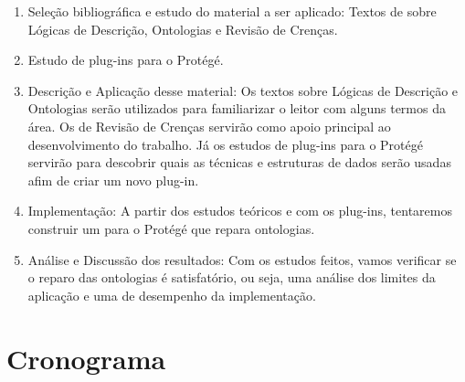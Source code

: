 \documentclass[12pt,letterpaper]{article}
\begin{document}
	\begin{enumerate}
		\item Seleção bibliográfica e estudo do material a ser aplicado: Textos de sobre Lógicas de Descrição, Ontologias e Revisão de Crenças. 
		\item Estudo de plug-ins para o Protégé.
		\item Descrição e Aplicação desse material: Os textos sobre Lógicas de Descrição e Ontologias serão utilizados para familiarizar o leitor com alguns termos da área. Os de Revisão de Crenças servirão como apoio principal ao desenvolvimento do trabalho. Já os estudos de plug-ins para o Protégé servirão para descobrir quais as técnicas e estruturas de dados serão usadas afim de criar um novo plug-in. 
		\item Implementação: A partir dos estudos teóricos e com os plug-ins, tentaremos construir um para o Protégé que repara ontologias.
		\item Análise e Discussão dos resultados: Com os estudos feitos, vamos verificar se o reparo das ontologias é satisfatório, ou seja, uma análise dos limites da aplicação e uma de desempenho da implementação.
	\end{enumerate}
	
	\section{Cronograma}
	
	
	
	 
\end{document}
